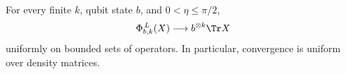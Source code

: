 \begin{lemma}\label{lem:relaxation}
For every finite $k$, qubit state $b$, and $0<\eta\le\pi/2$,
\begin{equation}
 \Phi_{b,k}^{\,L}(X)\longrightarrow b^{\otimes k}\Tr X
 \label{eq:relaxation}
\end{equation}
uniformly on bounded sets of operators. In particular, convergence is uniform over density matrices.
\end{lemma}
